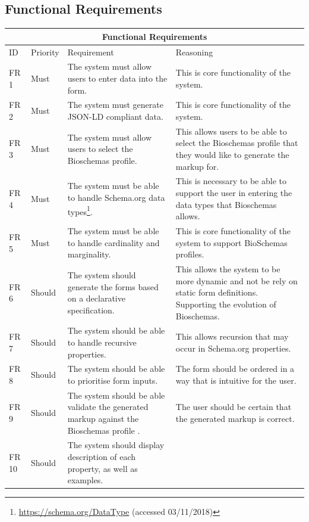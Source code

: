 \subsection{Functional Requirements}\label{sec:functionalReq}
{

\begin{longtable}{ |p{1.5cm}|p{1.75cm}|p{5cm}|p{5cm}|  }
 \hline
 \multicolumn{4}{|c|}{Functional Requirements} \\
 \hline
 ID & Priority &Requirement& Reasoning\\
 \hline
 FR 1   & Must & The system must allow users to enter data into the form. & 
 This is core functionality of the system.\\
 \hline
 FR 2   & Must & The system must generate JSON-LD compliant data.&
 This is core functionality of the system.\\
  \hline
 FR 3   & Must & The system must allow users to select the Bioschemas profile.&  
 This allows users to be able to select the Bioschemas profile that they would like to generate the markup for.\\
  \hline
 FR 4  & Must & The system must be able to handle Schema.org data types\footnote{\url{https://schema.org/DataType} (accessed 03/11/2018)}.& 
 This is necessary to be able to support the user in entering the data types that Bioschemas allows.\\
   \hline
 FR 5   & Must & The system must be able to handle cardinality and marginality.&
 This is core functionality of the system to support BioSchemas profiles.\\
   \hline
  FR 6   & Should & The system should generate the forms based on a declarative specification.&
 This allows the system to be more dynamic and not be rely on static form definitions. Supporting the evolution of Bioschemas.\\
  \hline
 FR 7   & Should  & The system should be able to handle recursive properties.&
 This allows recursion that may occur in Schema.org properties.\\
   \hline
 FR 8   & Should  & The system should be able to prioritise form inputs.&
 The form should be ordered in a way that is intuitive for the user.\\
   \hline
 FR 9   & Should  & The system should be able validate the generated markup against the Bioschemas profile .&
 The user should be certain that the generated markup is correct.\\
    \hline
 FR 10   & Should  & The system should display description of each property, as well as examples.&

\end{longtable}}
